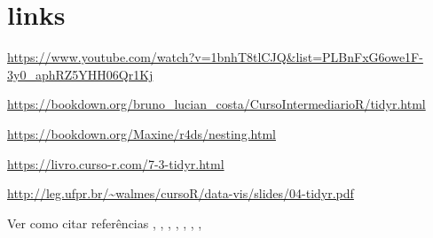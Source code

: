 \documentclass[
]{book}
\begin{document}
\hypertarget{links}{%
\section{links}\label{links}}

\url{https://www.youtube.com/watch?v=1bnhT8tlCJQ\&list=PLBnFxG6owe1F-3y0_aphRZ5YHH06Qr1Kj}

\url{https://bookdown.org/bruno_lucian_costa/CursoIntermediarioR/tidyr.html}

\url{https://bookdown.org/Maxine/r4ds/nesting.html}

\url{https://livro.curso-r.com/7-3-tidyr.html}

\url{http://leg.ufpr.br/~walmes/cursoR/data-vis/slides/04-tidyr.pdf}

Ver como citar referências \citet{tidyverse2019}, \citet{R-tidyverse}, \citet{R-tidyr}, \citet{R-ggplot2}, \citet{R-purrr}, \citet{R-dplyr}, \citet{R-knitr}, \citet{R-bookdown}

  
\end{document}
